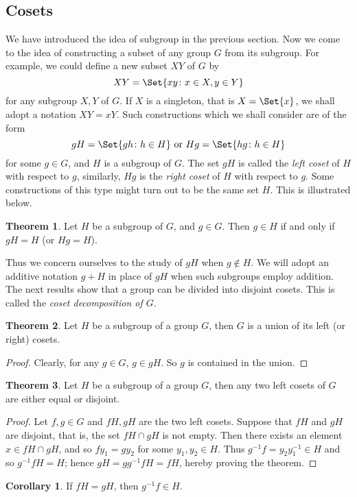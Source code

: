 \documentclass[12pt]{book}
\theoremstyle{definition}
\newtheorem{theorem}{Theorem}[chapter]
\newtheorem{corollary}{Corollary}[section]
\theoremstyle{remark}
\begin{document}
			\subsection{Cosets}
				We have introduced the idea of subgroup in the previous section. Now we come to the idea of constructing a subset of any group $G$ from its subgroup. For example, we could define a new subset $XY$ of $G$ by
				\begin{equation*}
					XY = \Set{xy \colon x \in X, y\in Y}
				\end{equation*}
				for any subgroup $X, Y$ of $G$. If $X$ is a singleton, that is $X = \Set{x}$, we shall adopt a notation $XY = xY$. Such constructions which we shall consider are of the form
				\begin{equation*}
					gH = \Set{gh \colon h\in H} \text{ or } Hg = \Set{hg \colon h \in H}
				\end{equation*}
				for some $g \in G$, and $H$ is a subgroup of $G$. The set $gH$ is called the \textit{left coset} of $H$ with respect to $g$, similarly, $Hg$ is the \textit{right coset} of $H$ with respect to $g$. Some constructions of this type might turn out to be the same set $H$. This is illustrated below.
				
				\begin{theorem}
					Let $H$ be a subgroup of $G$, and $g \in G$. Then $g \in H$ if and only if $gH = H$ (or $Hg = H$).
				\end{theorem}
				
				Thus we concern ourselves to the study of $gH$ when $g \notin H$. We will adopt an additive notation $g + H$ in place of $gH$ when such subgroups employ addition. The next results show that a group can be divided into disjoint cosets. This is called the \textit{coset decomposition of $G$}.
				
				\begin{theorem}
					Let $H$ be a subgroup of a group $G$, then $G$ is a union of its left (or right) cosets.
				\end{theorem}
				\begin{proof}
					Clearly, for any $g \in G$, $g \in gH$. So $g$ is contained in the union.
				\end{proof}
			
				\begin{theorem}
					Let $H$ be a subgroup of a group $G$, then any two left cosets of $G$ are either equal or disjoint.
				\end{theorem}
				\begin{proof}
					Let $f, g \in G$ and $fH, gH$ are the two left cosets. Suppose that $fH$ and $gH$ are disjoint, that is, the set $fH \cap gH$ is not empty. Then there exists an element $x \in fH \cap gH$, and so $fy_1 = gy_2$ for some $y_1, y_2 \in H$. Thus $g^{-1}f = y_2y^{-1}_1 \in H$ and so $g^{-1}fH = H$; hence $gH = g g^{-1} f H = fH$, hereby proving the theorem.
				\end{proof}
				\begin{corollary}
					If $fH = gH$, then $g^{-1} f \in H$.
				\end{corollary}
				
\end{document}
